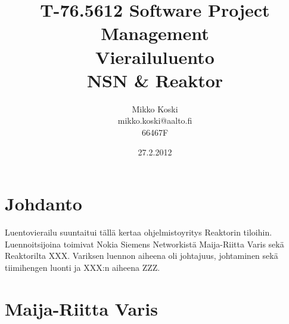 \documentclass[a4paper]{article}
\begin{document}
\title{\small T-76.5612 Software Project Management \\ Vierailuluento \\ \huge NSN & Reaktor}
\date{27.2.2012}
\author{Mikko Koski \\ mikko.koski@aalto.fi \\ 66467F}
\maketitle

\normalsize

\section{Johdanto}

Luentovierailu suuntaitui tällä kertaa ohjelmistoyritys Reaktorin tiloihin. Luennoitsijoina toimivat Nokia Siemens Networkistä Maija-Riitta Varis sekä Reaktorilta XXX. Variksen luennon aiheena oli johtajuus, johtaminen sekä tiimihengen luonti ja XXX:n aiheena ZZZ.

\section{Maija-Riitta Varis}



\end{document}
